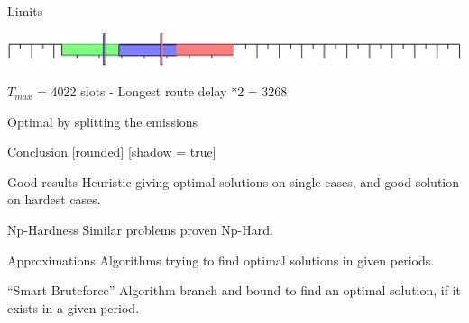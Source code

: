 \documentclass{beamer}
\begin{document}
\begin{frame}{Limits}
    
  \centering
  \scalebox{0.5}
  {

  }
  \includegraphics[scale = 0.2]{chronogrames/16.jpeg}
  
  $T_{max}$ = 4022 slots - Longest route delay *2 = 3268
  
  Optimal by splitting the emissions
\end{frame}



\begin{frame}{Conclusion}
[rounded]%
[shadow = true]
\begin{block}{Good results}
Heuristic giving optimal solutions on single cases, and good solution on hardest cases.
\end{block}
\begin{block}{Np-Hardness}
Similar problems proven Np-Hard.
\end{block}
\begin{block}{Approximations}
Algorithms trying to find optimal solutions in given periods.
\end{block}
\begin{block}{``Smart Bruteforce''}
Algorithm branch and bound to find an optimal solution, if it exists in a given period.
\end{block}

\end{frame}
\end{document}
